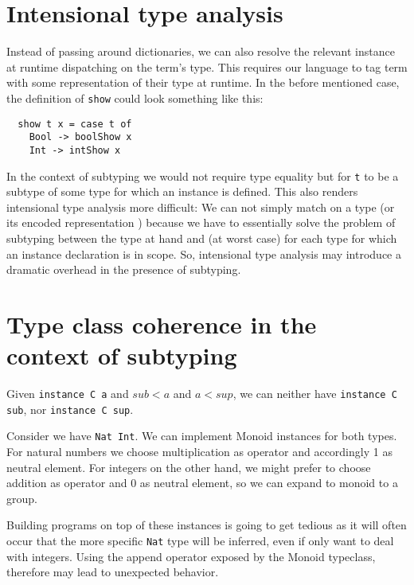 \section{Intensional type analysis}

Instead of passing around dictionaries, we can also resolve the relevant instance at runtime dispatching on the term's type.
This requires our language to tag term with some representation of their type at runtime.
In the before mentioned case, the definition of \texttt{show} could look something like this:

\begin{verbatim}
  show t x = case t of
    Bool -> boolShow x
    Int -> intShow x
\end{verbatim}

In the context of subtyping we would not require type equality but for \texttt{t} to be a subtype of some type for which an instance is defined.
This also renders intensional type analysis more difficult:
We can not simply match on a type (or its encoded representation \cite{weirich2000}) because we have to essentially solve the problem of subtyping between the type at hand and (at worst case) for each type for which an instance declaration is in scope.
So, intensional type analysis may introduce a dramatic overhead in the presence of subtyping.

\section{Type class coherence in the context of subtyping}
  Given \texttt{instance C a} and $sub < a$ and $a < sup$, we can neither have \texttt{instance C sub}, nor \texttt{instance C sup}.

  Consider we have \texttt{Nat \sub Int}.
  We can implement Monoid instances for both types. For natural numbers we choose multiplication as operator and accordingly 1 as neutral element.
  For integers on the other hand, we might prefer to choose addition as operator and 0 as neutral element, so we can expand to monoid to a group.

  Building programs on top of these instances is going to get tedious as it will often occur that the more specific \texttt{Nat} type will be inferred,
  even if only want to deal with integers.
  Using the append operator exposed by the Monoid typeclass, therefore may lead to unexpected behavior.

